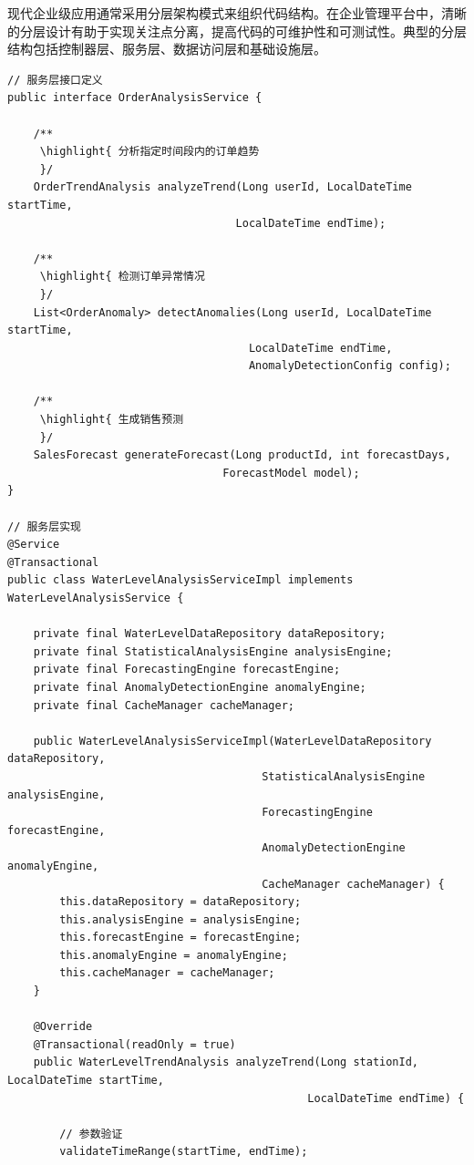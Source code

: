 现代企业级应用通常采用分层架构模式来组织代码结构。在企业管理平台中，清晰的分层设计有助于实现关注点分离，提高代码的可维护性和可测试性。典型的分层结构包括控制器层、服务层、数据访问层和基础设施层。

\begin{lstlisting}[style=java]
// 服务层接口定义
public interface OrderAnalysisService {
    
    /**
     \highlight{ 分析指定时间段内的订单趋势
     }/
    OrderTrendAnalysis analyzeTrend(Long userId, LocalDateTime startTime, 
                                   LocalDateTime endTime);
    
    /**
     \highlight{ 检测订单异常情况
     }/
    List<OrderAnomaly> detectAnomalies(Long userId, LocalDateTime startTime, 
                                     LocalDateTime endTime, 
                                     AnomalyDetectionConfig config);
    
    /**
     \highlight{ 生成销售预测
     }/
    SalesForecast generateForecast(Long productId, int forecastDays,
                                 ForecastModel model);
}

// 服务层实现
@Service
@Transactional
public class WaterLevelAnalysisServiceImpl implements WaterLevelAnalysisService {
    
    private final WaterLevelDataRepository dataRepository;
    private final StatisticalAnalysisEngine analysisEngine;
    private final ForecastingEngine forecastEngine;
    private final AnomalyDetectionEngine anomalyEngine;
    private final CacheManager cacheManager;
    
    public WaterLevelAnalysisServiceImpl(WaterLevelDataRepository dataRepository,
                                       StatisticalAnalysisEngine analysisEngine,
                                       ForecastingEngine forecastEngine,
                                       AnomalyDetectionEngine anomalyEngine,
                                       CacheManager cacheManager) {
        this.dataRepository = dataRepository;
        this.analysisEngine = analysisEngine;
        this.forecastEngine = forecastEngine;
        this.anomalyEngine = anomalyEngine;
        this.cacheManager = cacheManager;
    }
    
    @Override
    @Transactional(readOnly = true)
    public WaterLevelTrendAnalysis analyzeTrend(Long stationId, LocalDateTime startTime, 
                                              LocalDateTime endTime) {
        
        // 参数验证
        validateTimeRange(startTime, endTime);
        

\end{lstlisting}
